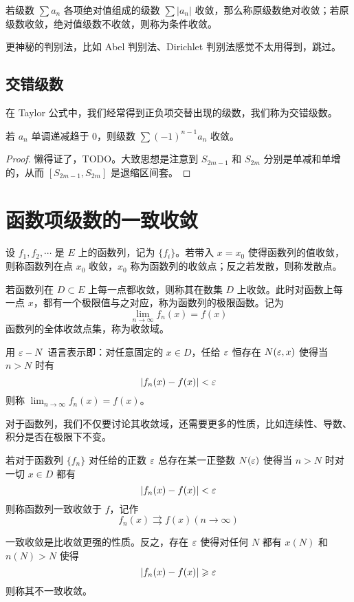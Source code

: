 若级数 $\sum a_n$ 各项绝对值组成的级数 $\sum |a_n|$ 收敛，那么称原级数绝对收敛；若原级数收敛，绝对值级数不收敛，则称为条件收敛。

更神秘的判别法，比如 Abel 判别法、Dirichlet 判别法感觉不太用得到，跳过。

\subsection{交错级数}

在 Taylor 公式中，我们经常得到正负项交替出现的级数，我们称为交错级数。

\begin{theorem}
	若 $a_n$ 单调递减趋于 $0$，则级数 $\sum (-1)^{n-1} a_n$ 收敛。
\end{theorem}

\begin{proof}
	懒得证了，TODO。大致思想是注意到 $S_{2m-1}$ 和 $S_{2m}$ 分别是单减和单增的，从而 $[S_{2m-1}, S_{2m}]$ 是退缩区间套。
\end{proof}

\section{函数项级数的一致收敛}

设 $f_1, f_2, \cdots$ 是 $E$ 上的函数列，记为 $\{f_i\}$。若带入 $x = x_0$ 使得函数列的值收敛，则称函数列在点 $x_0$ 收敛，$x_0$ 称为函数列的收敛点；反之若发散，则称发散点。

若函数列在 $D \subset E$ 上每一点都收敛，则称其在数集 $D$ 上收敛。此时对函数上每一点 $x$，都有一个极限值与之对应，称为函数列的极限函数。记为
\[ \lim_{n \to \infty} f_n(x) = f(x) \]
函数列的全体收敛点集，称为收敛域。

用 $\varepsilon - N$ 语言表示即：对任意固定的 $x \in D$，任给 $\varepsilon$ 恒存在 $N(\varepsilon, x)$ 使得当 $n > N$ 时有
\[ | f_n(x) - f(x) | < \varepsilon \]
则称 $\lim_{n \to \infty} f_n(x) = f(x)$。

对于函数列，我们不仅要讨论其收敛域，还需要更多的性质，比如连续性、导数、积分是否在极限下不变。

\begin{definition}
	若对于函数列 $\{f_n\}$ 对任给的正数 $\varepsilon$ 总存在某一正整数 $N(\varepsilon)$ 使得当 $n > N$ 时对一切 $x \in D$ 都有
	\[ |f_n(x) - f(x)| < \varepsilon \]
	则称函数列一致收敛于 $f$，记作
	\[ f_n(x) \rightrightarrows f(x) (n \to \infty) \]
\end{definition}

一致收敛是比收敛更强的性质。反之，存在 $\varepsilon$ 使得对任何 $N$ 都有 $x(N)$ 和 $n(N) > N$ 使得
\[ |f_n(x) - f(x) | \geqslant \varepsilon \]
则称其不一致收敛。


